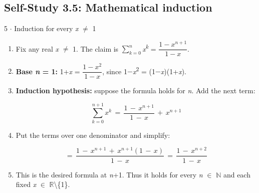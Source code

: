 \documentclass[11pt]{article}
\begin{document}
\begin{keepsection}\subsection{Self-Study 3.5: Mathematical induction}

\begin{workedbox}{5 \ensuremath{\cdot} Induction for every \textit{x} \ensuremath{\neq} 1}
\begin{enumerate}
\item Fix any real \textit{x} \ensuremath{\neq} 1. The claim is $\sum_{{k}=0}^{{n}} $\textit{x}\textsuperscript{\textit{k}} = {\small\ensuremath{\dfrac{1-{x}^{{n}+1}}{1-{x}}}}.
\item \textbf{Base \textit{n} = 1:} 1+\textit{x} = {\small\ensuremath{\dfrac{1-{x}^{2}}{1-{x}}}}, since 1\ensuremath{-}\textit{x}\textsuperscript{2} = (1\ensuremath{-}\textit{x})(1+\textit{x}).
\item {}
\textbf{Induction hypothesis:} suppose the formula holds for \textit{n}. Add the next term:

\begin{equation*}\sum_{{k}=0}^{{n}+1} {x}^{{k}}\, =\, \dfrac{1\, -\, {x}^{{n}+1}}{1\, -\, {x}}\, +\, {x}^{{n}+1}\end{equation*}
\item {}
Put the terms over one denominator and simplify:

\begin{equation*}=\, \dfrac{1\, -\, {x}^{{n}+1}\, +\, {x}^{{n}+1}(1\, -\, {x})}{1\, -\, {x}}\, =\, \dfrac{1\, -\, {x}^{{n}+2}}{1\, -\, {x}}\end{equation*}
\item This is the desired formula at \textit{n}+1. Thus it holds for every \textit{n} \ensuremath{\in} \ensuremath{\mathbb{N}} and each fixed \textit{x} \ensuremath{\in} \ensuremath{\mathbb{R}}\textbackslash{}\{1\}.
\end{enumerate}
\end{workedbox}

\end{keepsection}
\end{document}
